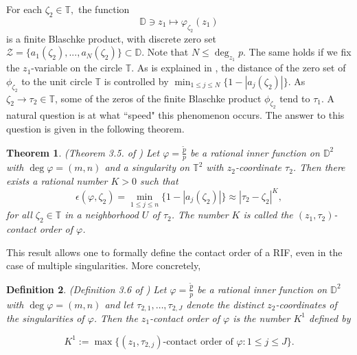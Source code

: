 \documentclass[11pt]{amsart}
\newtheorem{theorem}{Theorem}[section]
\newtheorem{definition}[theorem]{Definition}
\numberwithin{equation}{section}
\begin{document}
For each $\zeta_2\in\mathbb{T},$ the function \[\mathbb{D}\ni z_1\mapsto \varphi_{\zeta_2}(z_1)\] is a finite Blaschke product, with discrete zero set $\mathcal{Z}= \{a_1(\zeta_2),...,a_N(\zeta_2)\}\subset \mathbb{D}.$ Note that $N\leq \deg_{z_1}p $.
The same holds if we fix the $z_1$-variable on the circle $\mathbb{T}.$ As is explained in \cite{PLMS}, the distance of the zero set of $\phi_{\zeta_2}$ to the unit circle $\mathbb{T}$ is controlled by $\min_{1\leq j\leq N}\{1-|a_j(\zeta_2)|\}.$ As $\zeta_2 \to \tau_2 \in \mathbb{T}$, some of the zeros of the finite Blaschke product $\phi_{\zeta_2}$ tend to $\tau_1$. A natural question is at what ``speed" this phenomenon occurs. The answer to this question is given in the following theorem.
\begin{theorem}(Theorem 3.5. of \cite{PLMS}) 
\label{def:loccont}
Let
$\varphi=\frac{\tilde p}{p}$ 
be a rational inner function on $\mathbb{D}^2$ with $\deg \varphi=(m,n)$ and a
singularity on $\mathbb{T}^2$ with $z_2$-coordinate $\tau_2$. Then there exists a
rational number $K>0$ such that
$$\epsilon(\varphi,\zeta_2)=\min_{1\leq j\leq n}\{1-|a_j(\zeta_2)|\}\approx |\tau_2-\zeta_2|^K,$$
for all $\zeta_2\in\mathbb{T}$ in a neighborhood $U$ of $\tau_2$. The number $K$ is
called the $(z_1,\tau_2)$-contact order of $\varphi$.
\end{theorem}

This result allows one to formally define the contact order of a RIF, even in the case of multiple singularities. More concretely,

\begin{definition}(Definition 3.6 of \cite{PLMS}) Let $\varphi=\frac{\tilde p}{p}$ be a rational inner function on $\mathbb{D}^2$ with $\deg \varphi=(m,n)$ and let
$\tau_{2,1},\ldots,\tau_{2,J}$ denote the distinct $z_2$-coordinates of the singularities of
$\varphi$. Then the $z_1$-contact order of $\varphi$ is the number $K^1$ defined by

$$K^1:=\max\bigl\{(z_1,\tau_{2,j})\text{-contact order of }\varphi : 1\le j\le J\bigr\}.$$
\end{definition}
\end{document}
